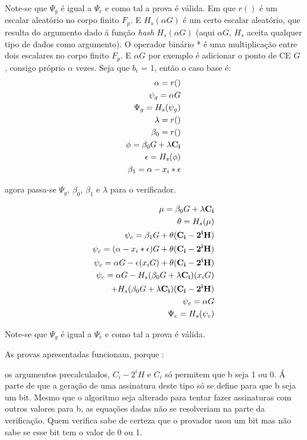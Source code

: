 Note-se que $\Psi_g$ é igual a $\Psi_c$ e como tal a prova é válida.\newline
Em que $r()$ é um escalar aleatório no corpo finito $F_p$. E $H_s(\alpha G)$ é um certo escalar aleatório, que resulta do argumento dado á função {\em hash} $H_s(\alpha G)$ (aqui $\alpha G$, $H_s$ aceita qualquer tipo de dados como argumento).   
O operador binário * é uma multiplicação entre dois escalares no corpo finito $F_p$. E $\alpha G$ por exemplo é adicionar o ponto de CE $G$, consigo próprio $\alpha$ vezes.  
\newpage
Seja que $b_i$ = 1, então o caso base é:
\begin{align*}
\alpha=r()\\
\psi_g = \alpha G\\
\Psi_g = H_s(\psi_g)\\
\lambda = r()\\
\beta_0=r()\\
\phi=\beta_0 G + \lambda \bold{C_i}\\
\epsilon = H_s(\phi)\\
\beta_1 = \alpha-x_i*\epsilon\\
\end{align*}

agora passa-se $\Psi_g$, $\beta_0$, $\beta_1$ e $\lambda$ para o verificador.  

\begin{align*}
\mu=\beta_0 G + \lambda \bold{C_i}\\
\theta= H_s(\mu)\\
\psi_c = \beta_1 G + \theta (\bold{C_i - 2^i H})\\
\psi_c = (\alpha-x_i*\epsilon) G + \theta (\bold{C_i - 2^i H})\\
\psi_c = \alpha G - \epsilon(x_i G)
                  + \theta (\bold{C_i - 2^i H})\\
\psi_c = \alpha G - H_s(\beta_0 G + \lambda \bold{C_i})(x_i G)\\
                 + H_s(\beta_0 G + \lambda \bold{C_i})(\bold{C_i - 2^i H})\\
\psi_c = \alpha G\\ 
\Psi_c = H_s(\psi_c)\\
\end{align*}

Note-se que $\Psi_g$ é igual a $\Psi_c$ e como tal a prova é válida.

As provas apresentadas funcionam, porque :

os argumentos precalculados, $C_i - 2^i H$ e $C_i$ só permitem que b seja 1 ou 0.
Á parte de que a geração de uma assinatura deste tipo só se define para que b seja um bit. Mesmo que o algoritmo seja alterado para tentar fazer assinaturas com outros valores para b, as equações dadas não se resolveriam na parte da verificação.
Quem verifica sabe de certeza que o provador usou um bit mas não sabe se esse bit tem o valor de 0 ou 1.

